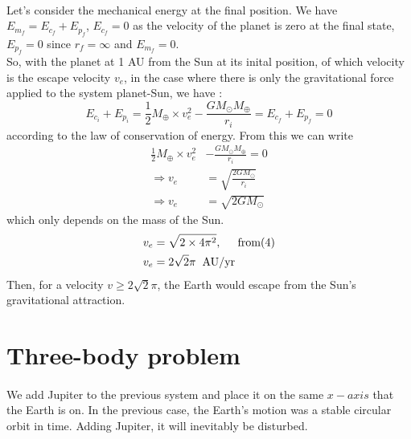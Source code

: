 \documentclass[a4paper, twoside, 11pt]{report}
\theoremstyle{theorem}
\theoremstyle{remark}
\theoremstyle{exemple}
\begin{document}
            \paragraph{}Let's consider the mechanical energy at the final position. We have $E_{m_f} = E_{c_f} + E_{p_f}$, $E_{c_f} = 0$ as the velocity of the planet is zero at the final state, $E_{p_f}=0$ since $r_f=\infty$ and $E_{m_f}=0$. \\
            So, with the planet at 1 AU from the Sun at its inital position, of which velocity is the escape velocity $v_e$, in the case where there is only the gravitational force applied to the system planet-Sun, we have :
                \begin{equation*}
                    E_{c_i} + E_{p_i} = \frac{1}{2}M_{\oplus} \times v_e^2 - \frac{GM_{\odot}M_{\oplus}}{r_i} = E_{c_f} + E_{p_f} = 0
                \end{equation*}
            according to the law of conservation of energy. From this we can write
                \begin{align*}
                    \frac{1}{2}M_{\oplus} \times v_e^2 &- \frac{GM_{\odot}M_{\oplus}}{r_i} = 0 \\
                    \Rightarrow v_e &= \sqrt{\frac{2GM_{\odot}}{r_i}} \\
                    \Rightarrow v_e &=\sqrt{2GM_{\odot}}
                \end{align*}
            which only depends on the mass of the Sun. 
                \begin{align*}
                    v_e &= \sqrt{2\times 4\pi^2}, \hspace{0.5cm} \mathrm{from (4)}\\
                    v_e &= 2\sqrt{2}\pi \hspace{0.2cm} \mathrm{AU/yr}
                \end{align*}
            Then, for a velocity $v \geq 2\sqrt{2}\pi$, the Earth would escape from the Sun's gravitational attraction. 
                        
                        
    
    \section{Three-body problem}
        \paragraph{}We add Jupiter to the previous system and place it on the same $x-axis$ that the Earth is on. In the previous case, the Earth's motion was a stable circular orbit in time. Adding Jupiter, it will inevitably be disturbed.
        
\end{document}
